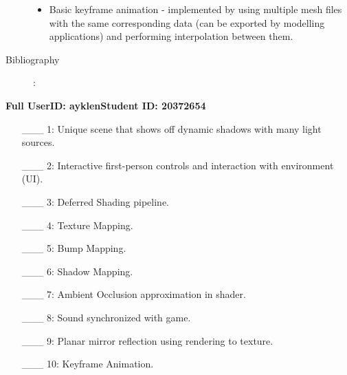 \documentclass {article}
\begin{document}
\begin{description}
\begin{itemize}
      \item
        Basic keyframe animation - implemented by using multiple mesh files with the same corresponding data (can be exported by modelling applications) and performing interpolation between them.

    \end{itemize}

  \item[Bibliography]:\\

    \begingroup
    \renewcommand{\section}[2]{}%
    \nocite{*}
    {}
    
    \endgroup

\end{description}
\newpage



{\hfill{\bf Full UserID: ayklen}\hfill{\bf Student ID: 20372654}\hfill}

\begin{enumerate}
  \item[\_\_\_ 1:]  Unique scene that shows off dynamic shadows with many light sources.

  \item[\_\_\_ 2:]  Interactive first-person controls and interaction with environment (UI).

  \item[\_\_\_ 3:]  Deferred Shading pipeline.

  \item[\_\_\_ 4:]  Texture Mapping.

  \item[\_\_\_ 5:]  Bump Mapping.

  \item[\_\_\_ 6:]  Shadow Mapping.

  \item[\_\_\_ 7:]  Ambient Occlusion approximation in shader.

  \item[\_\_\_ 8:]  Sound synchronized with game.

  \item[\_\_\_ 9:]  Planar mirror reflection using rendering to texture.

  \item[\_\_\_ 10:] Keyframe Animation.
\end{enumerate}

\end{document}

